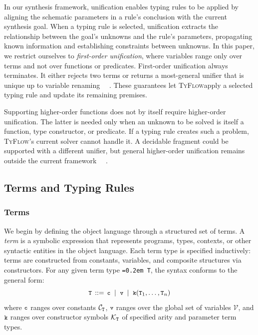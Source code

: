 \documentclass[manuscript,screen]{acmart}
\newcommand{\toolname}[1]{\textsc{#1}}
\newcommand{\tcode}[1]{{\small \texttt{\spaceskip=0.2em #1}}}
\newcommand{\scode}[1]{{\fontsize{8.2pt}{\baselineskip}\tt \texttt{\spaceskip=0.15em #1}}}
\newcommand{\mainname}{\toolname{TyFlow}\xspace}
\begin{document}
In our synthesis framework, unification enables typing rules to be applied by aligning the schematic parameters in a rule's conclusion with the current synthesis goal. When a typing rule is selected, unification extracts the relationship between the goal's unknowns and the rule's parameters, propagating known information and establishing constraints between unknowns.
%
In this paper, we restrict ourselves to \emph{first-order unification}, where variables range only over terms and not over functions or predicates. 
First-order unification    {\color{revblue}always terminates. It either rejects two terms or returns a most-general unifier that is unique up to variable renaming~\mbox{%
\cite{DBLP:journals/jacm/Robinson65}}\hskip0pt%
. These guarantees let }\mainname {\color{revblue}apply a selected typing rule and update its remaining premises.
}

{\color{revblue}Supporting higher-order functions does not by itself require higher-order unification. The latter is needed only when an unknown to be solved is itself a function, type constructor, or predicate. If a typing rule creates such a problem, }\mainname{\color{revblue}'s current solver cannot handle it. A decidable fragment could be supported with a different unifier, but general higher-order unification remains outside the current framework~\mbox{%
\cite{DBLP:journals/tcs/Goldfarb81}}\hskip0pt%
} .

\subsection{Terms and Typing Rules}
\subsubsection{Terms}
\label{terms-intro}
We begin by defining the object language through a structured set of terms. A \emph{term} is a symbolic expression that represents programs, types, contexts, or other syntactic entities in the object language. Each term type is specified inductively: terms are constructed from constants, variables, and composite structures via constructors. For any given term type \tcode{T}, the syntax conforms to the general form:
\[\tcode{T} \,::=\, \tcode{c} \;\mid\; \tcode{v} \;\mid\; \tcode{k}(\tcode{T}_1, \ldots, \tcode{T}_n)\]
where \(\tcode{c}\) ranges over constants \(\mathcal{C}_\scode{T}\), \(\tcode{v}\) ranges over the global set of variables \(\mathcal{V}\), and \(\tcode{k}\) ranges over constructor symbols \(\mathcal{K}_\scode{T}\) of specified arity and parameter term types. 
\end{document}
